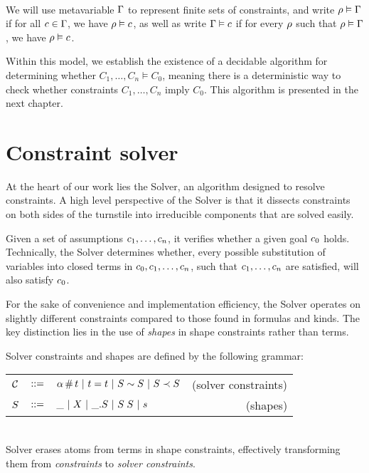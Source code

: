 \documentclass[english, mgr]{iithesis}
\renewcommand{\it}[1]{\textit{#1}}
\begin{document}
\\
We will use metavariable $\Gamma$ to represent finite sets of constraints,
and write $\rho \vDash \Gamma$ if for all $c \in \Gamma$,
we have $\rho \vDash c$,
as well as write $\Gamma \vDash c$ if for every $\rho$ such that $\rho \vDash \Gamma$,
we have $\rho \vDash c$.

Within this model, we establish the existence of a decidable algorithm for determining whether $C_1, \ldots, C_n \vDash C_0$,
meaning there is a deterministic way to check whether constraints $C_1, \ldots, C_n$ imply $C_0$.
This algorithm is presented in the next chapter.


\chapter{Constraint solver}
At the heart of our work lies the Solver, an algorithm designed to resolve constraints.
A high level perspective of the Solver is that it dissects constraints on both sides of the turnstile into irreducible components that are solved easily.

Given a set of assumptions $c_1, \dots, c_n$, it verifies whether a given goal $c_0$ holds.
Technically, the Solver determines whether,
every possible substitution of variables into closed terms in $c_0, c_1, \dots, c_n$,
such that $c_1, \dots, c_n$ are satisfied, will also satisfy $c_0$.

For the sake of convenience and implementation efficiency, the Solver operates
on slightly different constraints compared to those found in formulas and kinds.
The key distinction lies in the use of \it{shapes} in shape constraints rather than terms.

Solver constraints and shapes are defined by the following grammar: \\
\begin{tabular}{rclr}
  $\mathcal{C}$ & $::=$ & $\alpha \,\#\, t
  \ |\  t = t
  \ |\  S \sim S
  \ |\  S \prec S$
      & (solver constraints) \\
  $S$      & $::=$ & $\_
                 \ |\   X
                 \ |\  \_. S
                 \ |\  S \; S
                 \ |\  s$
      & (shapes)
\end{tabular}\\
Solver erases atoms from terms in shape constraints,
effectively transforming them from \it{constraints} to \it{solver constraints}.
\end{document}
